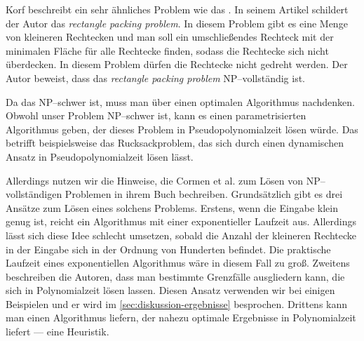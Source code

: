 Korf beschreibt ein sehr ähnliches Problem wie das \fp.\cite{korf} 
In seinem Artikel schildert der Autor das \textit{rectangle packing problem}.
In diesem Problem gibt es eine Menge von kleineren Rechtecken und man soll
ein umschließendes Rechteck mit der minimalen Fläche für alle Rechtecke finden,
sodass die Rechtecke sich nicht überdecken.
In diesem Problem dürfen die Rechtecke nicht gedreht werden.
Der Autor beweist, dass das \textit{rectangle packing problem} NP--vollständig ist.

Da das \fp{} NP--schwer ist, muss man über einen optimalen Algorithmus nachdenken. 
Obwohl unser Problem NP--schwer ist, kann es einen parametrisierten Algorithmus geben,
der dieses Problem in Pseudopolynomialzeit lösen würde.
Das betrifft beispielsweise das Rucksackproblem, das sich durch einen dynamischen 
Ansatz in Pseudopolynomialzeit lösen lässt.\cite{parametrized}

Allerdings nutzen wir die Hinweise, die Cormen et al. zum Lösen von NP--vollständigen Problemen
in ihrem Buch bechreiben. Grundsätzlich gibt es drei Ansätze zum Lösen eines
solchens Problems.\cite[S.~1106]{cormen}
Erstens, wenn die Eingabe klein genug ist, reicht ein 
Algorithmus mit einer exponentieller Laufzeit aus.
Allerdings lässt sich diese Idee schlecht umsetzen,
sobald die Anzahl der kleineren Rechtecke in der Eingabe sich in der Ordnung von Hunderten befindet.
Die praktische Laufzeit eines exponentiellen Algorithmus wäre in diesem Fall zu groß.
Zweitens beschreiben die Autoren,
dass man bestimmte Grenzfälle ausgliedern kann, die sich in Polynomialzeit lösen lassen.
Diesen Ansatz verwenden wir bei einigen Beispielen und er wird im \cref{sec:diskussion-ergebnisse}
besprochen.
Drittens kann man einen Algorithmus liefern, der nahezu optimale Ergebnisse 
in Polynomialzeit liefert --- eine Heuristik. 



